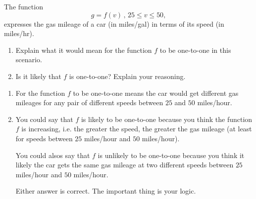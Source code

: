 \documentclass{ximera}
\begin{document}
\begin{example} \label{QlvemME8381O}
\item The function 
\[
  g = f(v)  \, , \, 25\leq v \leq 50 ,
\] 
expresses the gas mileage of a car (in miles/gal) in terms of its speed (in miles/hr).
   

\begin{enumerate}
   \item Explain what it would mean for the function $f$ to be one-to-one in this scenario.

  \item Is it likely that $f$ is one-to-one? Explain your reasoning.    
\end{enumerate}

\begin{explanation}
\begin{enumerate}
\item For the function $f$ to be one-to-one means the car would get different gas mileages for any pair of different speeds between $25$ and $50$ miles/hour.

\item You could say that $f$ is likely to be one-to-one because you think the function $f$ is increasing, i.e. the greater the speed, the greater the gas mileage (at least for speeds between $25$ miles/hour and $50$ miles/hour).

You could alsos say that $f$ is unlikely to be one-to-one because you think it likely the car gets the same gas mileage at two different speeds between $25$ miles/hour and $50$ miles/hour.

Either answer is correct. The important thing is your logic.
\end{enumerate}
\end{explanation}
\end{example}
\end{document}

